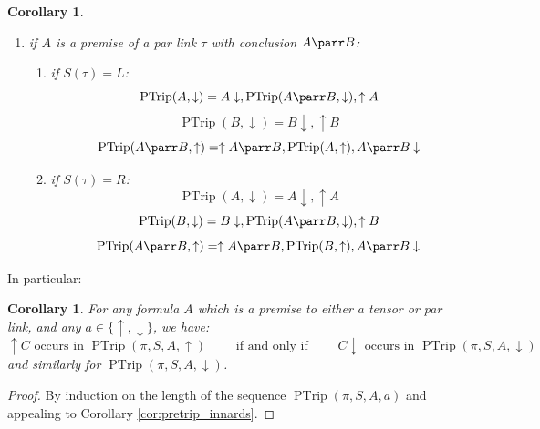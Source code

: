 \documentclass[12pt]{article}
\theoremstyle{plain}
\newtheorem{cor}[thm]{Corollary}
\theoremstyle{definition}
\begin{document}
\begin{cor}
\begin{enumerate}
\begin{enumerate}
\begin{equation}
				\end{equation}
			\end{enumerate}
			\item if $A$ is a premise of a par link $\tau$ with conclusion $A \parr B$:
			\begin{enumerate}
				\item if $S(\tau) = L$:
				\begin{equation}
					\operatorname{PTrip}(A,\downarrow) = A\downarrow, \operatorname{PTrip}(A \parr B, \downarrow), \uparrow A
				\end{equation}
				\begin{equation}
					\operatorname{PTrip}(B, \downarrow) = B\downarrow, \uparrow B
				\end{equation}
				\begin{equation}
					\operatorname{PTrip}(A \parr B, \uparrow) = \uparrow A \parr B, \operatorname{PTrip}(A, \uparrow), A \parr B \downarrow
				\end{equation}
				\item if $S(\tau) = R$:
				\begin{equation}
					\operatorname{PTrip}(A,\downarrow) = A\downarrow, \uparrow A
				\end{equation}
				\begin{equation}
					\operatorname{PTrip}(B, \downarrow) = B\downarrow, \operatorname{PTrip}(A \parr B, \downarrow), \uparrow B
				\end{equation}
				\begin{equation}
					\operatorname{PTrip}(A \parr B, \uparrow) = \uparrow A \parr B, \operatorname{PTrip}(B, \uparrow), A \parr B \downarrow
				\end{equation}
			\end{enumerate}
		\end{enumerate}
	\end{cor}
	In particular:
	\begin{cor}\label{cor:stays_contained_corollary}
		For any formula $A$ which is a premise to either a tensor or par link, and any $a \in \lbrace \uparrow, \downarrow \rbrace$, we have: $$\uparrow C \text{ occurs in } \operatorname{PTrip}(\pi,S,A,\uparrow)\qquad\text{ if and only if }\qquad C\downarrow \text{ occurs in } \operatorname{PTrip}(\pi,S,A,\downarrow)$$ and similarly for $\operatorname{PTrip}(\pi,S,A,\downarrow)$.
	\end{cor}
	\begin{proof}
		By induction on the length of the sequence $\operatorname{PTrip}(\pi,S,A,a)$ and appealing to Corollary \ref{cor:pretrip_innards}.
	\end{proof}
\end{document}
